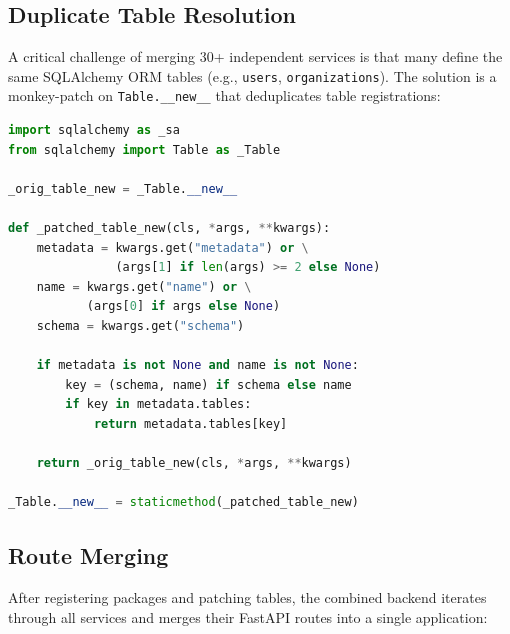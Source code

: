 \subsection{Duplicate Table Resolution}

A critical challenge of merging 30+ independent services is that many define the same SQLAlchemy ORM tables (e.g., \texttt{users}, \texttt{organizations}). The solution is a monkey-patch on \texttt{Table.\_\_new\_\_} that deduplicates table registrations:

\begin{lstlisting}[language=Python, caption=SQLAlchemy Table Deduplication]
import sqlalchemy as _sa
from sqlalchemy import Table as _Table

_orig_table_new = _Table.__new__

def _patched_table_new(cls, *args, **kwargs):
    metadata = kwargs.get("metadata") or \
               (args[1] if len(args) >= 2 else None)
    name = kwargs.get("name") or \
           (args[0] if args else None)
    schema = kwargs.get("schema")

    if metadata is not None and name is not None:
        key = (schema, name) if schema else name
        if key in metadata.tables:
            return metadata.tables[key]

    return _orig_table_new(cls, *args, **kwargs)

_Table.__new__ = staticmethod(_patched_table_new)
\end{lstlisting}

\subsection{Route Merging}

After registering packages and patching tables, the combined backend iterates through all services and merges their FastAPI routes into a single application:

